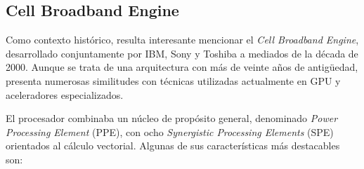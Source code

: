 \subsection{Cell Broadband Engine}

Como contexto histórico, resulta interesante mencionar el \textit{Cell Broadband Engine}, desarrollado conjuntamente por IBM, Sony y Toshiba a mediados de la década de 2000. Aunque se trata de una arquitectura con más de veinte años de antigüedad, presenta numerosas similitudes con técnicas utilizadas actualmente en GPU y aceleradores especializados.

El procesador combinaba un núcleo de propósito general, denominado \textit{Power Processing Element} (PPE), con ocho \textit{Synergistic Processing Elements} (SPE) orientados al cálculo vectorial. Algunas de sus características más destacables son:

